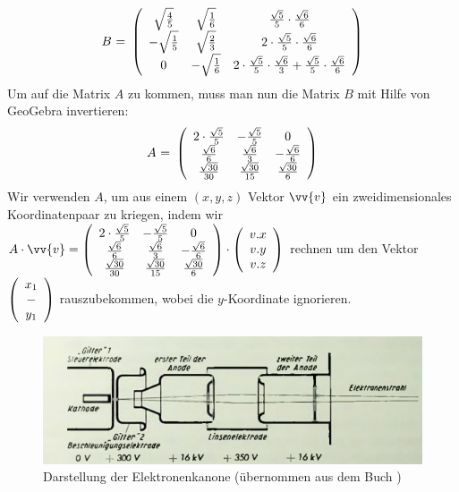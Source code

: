 $$\mbox{$B$ = } \left(\begin{array}{ccc} \sqrt{\frac{4}{5}}&\sqrt{\frac{1}{6}}&\frac{\sqrt{5}}{5} \cdot \frac{\sqrt{6}}{6}\\ -\sqrt{\frac{1}{5}}&\sqrt{\frac{2}{3}}&2 \cdot \frac{\sqrt{5}}{5} \cdot \frac{\sqrt{6}}{6}\\ 0&-\sqrt{\frac{1}{6}}&2 \cdot \frac{\sqrt{5}}{5} \cdot \frac{\sqrt{6}}{3} + \frac{\sqrt{5}}{5} \cdot \frac{\sqrt{6}}{6}\\ \end{array}\right)$$
Um auf die Matrix $A$ zu kommen, muss man nun die Matrix $B$ mit Hilfe von GeoGebra invertieren:
$$\mbox{$A$ = } \left(\begin{array}{ccc} 2\cdot\frac{\sqrt{5}}{5}&-\frac{\sqrt{5}}{5}&0\\ \frac{\sqrt{6}}{6}&\frac{\sqrt{6}}{3}&-\frac{\sqrt{6}}{6}\\ \frac{\sqrt{30}}{30}&\frac{\sqrt{30}}{15}&\frac{\sqrt{30}}{6}\\ \end{array}\right)$$
Wir verwenden $A$, um aus einem $(x,y,z)$ Vektor $\vv{v}$ ein zweidimensionales Koordinatenpaar zu kriegen, indem wir $ A \cdot \vv{v} = \m {2\cdot\frac{\sqrt{5}}{5}}{-\frac{\sqrt{5}}{5}}{0}{\frac{\sqrt{6}}{6}}{\frac{\sqrt{6}}{3}}{-\frac{\sqrt{6}}{6}}{\frac{\sqrt{30}}{30}}{\frac{\sqrt{30}}{15}}{\frac{\sqrt{30}}{6}} \cdot \vektor{v.x}{v.y}{v.z}$ rechnen um den Vektor $ \left(\begin{array}{c}x_1\\-\\y_1\end{array}\right)$ rauszubekommen, wobei die $y$-Koordinate ignorieren.  

\begin{figure}[h]
    \centering
    \includegraphics[width=.9\textwidth]{fig/Elektronenstrahl.PNG}
    \caption{Darstellung der Elektronenkanone (übernommen aus dem Buch \cite{Fernsehroehre})}
    \label{fig:elS}
\end{figure}